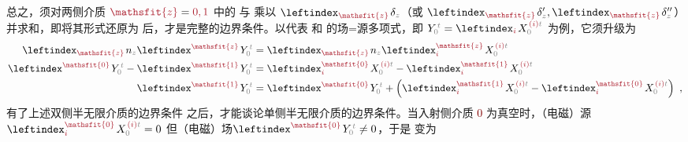 总之，须对两侧介质 $\textcolor{Maroon}{\mathsfit{z}} = \textcolor{Maroon}{0,1}$ 中的  与  乘以 $\leftindex_{\textcolor{Maroon}{\mathsfit{z}}} \;\! \delta_{\mathcolor{gray}{z}}$（或 $\leftindex_{\textcolor{Maroon}{\mathsfit{z}}} \;\! \delta'_{\mathcolor{gray}{z}},\leftindex_{\textcolor{Maroon}{\mathsfit{z}}} \;\! \delta''_{\mathcolor{gray}{z}}$）并求和，即将其形式还原为  后，才是完整的边界条件。以代表  和  的场=源多项式，即 $Y^{\;\!\mathcolor{gray}{t}}_{\mathcolor{gray}{0}} = \leftindex_{\textcolor{Maroon}{i}} \;\! X^{\;\!\textcolor{Maroon}{(i)}\mathcolor{gray}{t}}_{\mathcolor{gray}{0}}$ 为例，它须升级为
\begin{subequations} \label{eq:2BC}
\begin{align}
	\leftindex_{\textcolor{Maroon}{\mathsfit{z}}} \;\! n_{\mathcolor{gray}{z}} \leftindex^{\textcolor{Maroon}{\mathsfit{z}}} \;\! Y^{\;\!\mathcolor{gray}{t}}_{\mathcolor{gray}{0}} &= \leftindex_{\textcolor{Maroon}{\mathsfit{z}}} \;\! n_{\mathcolor{gray}{z}} \leftindex^{\textcolor{Maroon}{\mathsfit{z}}}_{\textcolor{Maroon}{i}} \;\! X^{\;\!\textcolor{Maroon}{(i)}\mathcolor{gray}{t}}_{\mathcolor{gray}{0}} \label{eq:^zY_0} \\ \leftindex^{\textcolor{Maroon}{\mathsfit{0}}} \;\! Y^{\;\!\mathcolor{gray}{t}}_{\mathcolor{gray}{0}} - \leftindex^{\textcolor{Maroon}{\mathsfit{1}}} \;\! Y^{\;\!\mathcolor{gray}{t}}_{\mathcolor{gray}{0}} &= \leftindex^{\textcolor{Maroon}{\mathsfit{0}}}_{\textcolor{Maroon}{i}} \;\! X^{\;\!\textcolor{Maroon}{(i)}\mathcolor{gray}{t}}_{\mathcolor{gray}{0}} - \leftindex^{\textcolor{Maroon}{\mathsfit{1}}}_{\textcolor{Maroon}{i}} \;\! X^{\;\!\textcolor{Maroon}{(i)}\mathcolor{gray}{t}}_{\mathcolor{gray}{0}} \label{eq:^0Y_0-^1Y_0} \\ \leftindex^{\textcolor{Maroon}{\mathsfit{1}}} \;\! Y^{\;\!\mathcolor{gray}{t}}_{\mathcolor{gray}{0}} &= \leftindex^{\textcolor{Maroon}{\mathsfit{0}}} \;\! Y^{\;\!\mathcolor{gray}{t}}_{\mathcolor{gray}{0}} + \left( \leftindex^{\textcolor{Maroon}{\mathsfit{1}}}_{\textcolor{Maroon}{i}} \;\! X^{\;\!\textcolor{Maroon}{(i)}\mathcolor{gray}{t}}_{\mathcolor{gray}{0}} - \leftindex^{\textcolor{Maroon}{\mathsfit{0}}}_{\textcolor{Maroon}{i}} \;\! X^{\;\!\textcolor{Maroon}{(i)}\mathcolor{gray}{t}}_{\mathcolor{gray}{0}} \right) ~, \label{eq:^1Y_0}
\end{align}
\end{subequations}
有了上述双侧半无限介质的边界条件  之后，才能谈论单侧半无限介质的边界条件。当入射侧介质 \textcolor{Maroon}{0} 为真空时，（电磁）源$\leftindex^{\textcolor{Maroon}{\mathsfit{0}}}_{\textcolor{Maroon}{i}} \;\! X^{\;\!\textcolor{Maroon}{(i)}\mathcolor{gray}{t}}_{\mathcolor{gray}{0}} = 0$ 但（电磁）场$\leftindex^{\textcolor{Maroon}{\mathsfit{0}}} \;\! Y^{\;\!\mathcolor{gray}{t}}_{\mathcolor{gray}{0}} \neq 0$，于是  变为
